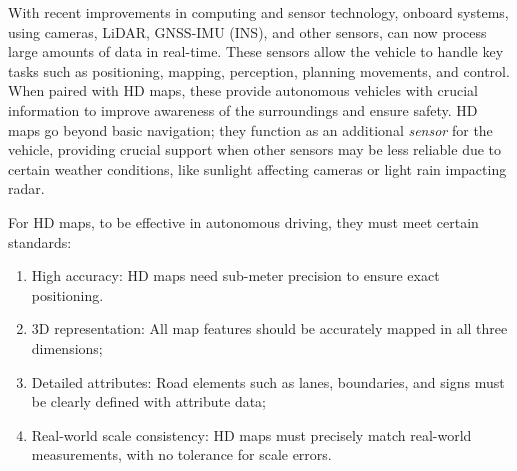 With recent improvements in computing and sensor technology, onboard systems, using cameras, LiDAR, GNSS-IMU (INS), and other sensors, can now process large amounts of data in real-time. These sensors allow the vehicle to handle key tasks such as positioning, mapping, perception, planning movements, and control. When paired with HD maps, these provide autonomous vehicles with crucial information to improve awareness of the surroundings and ensure safety.
HD maps go beyond basic navigation; they function as an additional \textit{sensor} for the vehicle, providing crucial support when other sensors may be less reliable due to certain weather conditions, like sunlight affecting cameras or light rain impacting radar\cite{edmap_2004}.

For HD maps, to be effective in autonomous driving, they must meet certain standards:
\begin{enumerate}
    \item High accuracy: HD maps need sub-meter precision to ensure exact positioning.
    \item 3D representation: All map features should be accurately mapped in all three dimensions;
    \item Detailed attributes: Road elements such as lanes, boundaries, and signs must be clearly defined with attribute data;
    \item Real-world scale consistency: HD maps must precisely match real-world measurements, with no tolerance for scale errors.
\end{enumerate}

